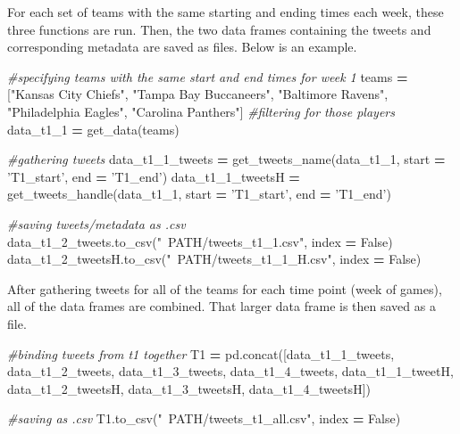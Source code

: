 \documentclass[12pt,twoside]{reedthesis}
\newenvironment{Shaded}{\begin{snugshade}}{\end{snugshade}}
\newcommand{\StringTok}[1]{\textcolor[rgb]{0.31,0.60,0.02}{#1}}
\newcommand{\CommentTok}[1]{\textcolor[rgb]{0.56,0.35,0.01}{\textit{#1}}}
\newcommand{\VariableTok}[1]{\textcolor[rgb]{0.00,0.00,0.00}{#1}}
\newcommand{\OperatorTok}[1]{\textcolor[rgb]{0.81,0.36,0.00}{\textbf{#1}}}
\newcommand{\NormalTok}[1]{#1}
\begin{document}
For each set of teams with the same starting and ending times each week,
these three functions are run. Then, the two data frames containing the
tweets and corresponding metadata are saved as files. Below is an
example.

\small
\begin{Shaded}
\begin{Highlighting}[]
\CommentTok{#specifying teams with the same start and end times for week 1}
\NormalTok{teams }\OperatorTok{=}\NormalTok{ [}\StringTok{"Kansas City Chiefs"}\NormalTok{, }\StringTok{"Tampa Bay Buccaneers"}\NormalTok{, }\StringTok{"Baltimore Ravens"}\NormalTok{,}
\StringTok{"Philadelphia Eagles"}\NormalTok{, }\StringTok{"Carolina Panthers"}\NormalTok{]}
\CommentTok{#filtering for those players}
\NormalTok{data_t1_1 }\OperatorTok{=}\NormalTok{ get_data(teams)}

\CommentTok{#gathering tweets}
\NormalTok{data_t1_1_tweets }\OperatorTok{=}\NormalTok{ get_tweets_name(data_t1_1, start }\OperatorTok{=} \StringTok{'T1_start'}\NormalTok{,}
\NormalTok{                                              end }\OperatorTok{=} \StringTok{'T1_end'}\NormalTok{)}
\NormalTok{data_t1_1_tweetsH }\OperatorTok{=}\NormalTok{ get_tweets_handle(data_t1_1, start }\OperatorTok{=} \StringTok{'T1_start'}\NormalTok{,}
\NormalTok{                                                 end }\OperatorTok{=} \StringTok{'T1_end'}\NormalTok{)}

\CommentTok{#saving tweets/metadata as .csv}
\NormalTok{data_t1_2_tweets.to_csv(}\StringTok{"~PATH/tweets_t1_1.csv"}\NormalTok{, index }\OperatorTok{=} \VariableTok{False}\NormalTok{)}
\NormalTok{data_t1_2_tweetsH.to_csv(}\StringTok{"~PATH/tweets_t1_1_H.csv"}\NormalTok{, index }\OperatorTok{=} \VariableTok{False}\NormalTok{)}
\end{Highlighting}
\end{Shaded}
\normalsize

After gathering tweets for all of the teams for each time point (week of
games), all of the data frames are combined. That larger data frame is
then saved as a file.

\small
\begin{Shaded}
\begin{Highlighting}[]
\CommentTok{#binding tweets from t1 together}
\NormalTok{T1 }\OperatorTok{=}\NormalTok{ pd.concat([data_t1_1_tweets, data_t1_2_tweets, }
\NormalTok{                data_t1_3_tweets, data_t1_4_tweets, }
\NormalTok{                data_t1_1_tweetH, data_t1_2_tweetsH,}
\NormalTok{                data_t1_3_tweetsH, data_t1_4_tweetsH])}

\CommentTok{#saving as .csv}
\NormalTok{T1.to_csv(}\StringTok{"~PATH/tweets_t1_all.csv"}\NormalTok{, index }\OperatorTok{=} \VariableTok{False}\NormalTok{)}
\end{Highlighting}
\end{Shaded}
\normalsize
\end{document}
